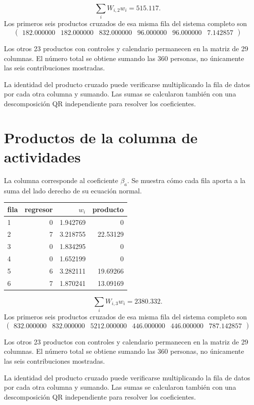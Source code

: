 \documentclass[11pt,a4paper]{article}
\begin{document}
\[
\sum_iW_{i,2}w_i=515.117.
\]
Los primeros seis productos cruzados de esa misma fila del sistema completo son
\[
\begin{pmatrix}182.000000 & 182.000000 & 832.000000 & 96.000000 & 96.000000 & 7.142857\end{pmatrix}
\]

Los otros 23 productos con controles y calendario permanecen en la matriz de 29 columnas. El número total se obtiene sumando las 360 personas, no únicamente las seis contribuciones mostradas.

La identidad del producto cruzado puede verificarse multiplicando la fila de datos por cada otra columna y sumando. Las sumas se calcularon también con una descomposición QR independiente para resolver los coeficientes.

\clearpage
\section{Productos de la columna de actividades}
La columna corresponde al coeficiente $\beta_a$. Se muestra cómo cada fila aporta a la suma del lado derecho de su ecuación normal.
\begin{center}\small
\begin{tabular}{lrrr}
\toprule
fila & regresor & $w_i$ & producto\\\midrule
1 & 0 & 1.942769 & 0\\
2 & 7 & 3.218755 & 22.53129\\
3 & 0 & 1.834295 & 0\\
4 & 0 & 1.652199 & 0\\
5 & 6 & 3.282111 & 19.69266\\
6 & 7 & 1.870241 & 13.09169\\
\bottomrule
\end{tabular}\end{center}

\[
\sum_iW_{i,3}w_i=2380.332.
\]
Los primeros seis productos cruzados de esa misma fila del sistema completo son
\[
\begin{pmatrix}832.000000 & 832.000000 & 5212.000000 & 446.000000 & 446.000000 & 787.142857\end{pmatrix}
\]

Los otros 23 productos con controles y calendario permanecen en la matriz de 29 columnas. El número total se obtiene sumando las 360 personas, no únicamente las seis contribuciones mostradas.

La identidad del producto cruzado puede verificarse multiplicando la fila de datos por cada otra columna y sumando. Las sumas se calcularon también con una descomposición QR independiente para resolver los coeficientes.
\end{document}
